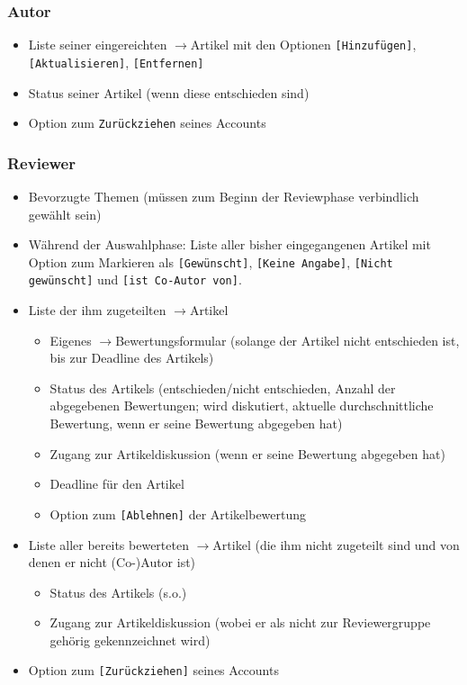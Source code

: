 \documentclass[headexclude,footexclude,12pt,BCOR0pt,DIV15]{scrartcl}
\begin{document}
        \subsubsection{Autor}
        \begin{itemize}
            \item Liste seiner eingereichten $\rightarrow$Artikel mit den Optionen \texttt{[Hinzuf\"{u}gen]},
                  \texttt{[Aktualisieren]}, \texttt{[Entfernen]}
            \item Status seiner Artikel (wenn diese entschieden sind)
            \item Option zum \texttt{Zur\"{u}ckziehen} seines Accounts
        \end{itemize}

        \pagebreak

        \subsubsection{Reviewer}
        \begin{itemize}
            \item Bevorzugte Themen (m\"{u}ssen zum Beginn der Reviewphase verbindlich gew\"{a}hlt sein)
            \item W\"{a}hrend der Auswahlphase: Liste aller bisher eingegangenen Artikel mit Option zum Markieren als
                  \texttt{[Gew\"{u}nscht]}, \texttt{[Keine Angabe]}, \texttt{[Nicht gew\"{u}nscht]} und \texttt{[ist Co-Autor von]}.
            \item Liste der ihm zugeteilten $\rightarrow$Artikel
            \begin{itemize}
                \item Eigenes $\rightarrow$Bewertungsformular (solange der Artikel nicht entschieden ist, bis zur Deadline des Artikels)
                \item Status des Artikels (entschieden/nicht entschieden, Anzahl der abgegebenen Bewertungen; wird diskutiert,
                    aktuelle durchschnittliche Bewertung, wenn er seine Bewertung abgegeben hat)
                \item Zugang zur Artikeldiskussion (wenn er seine Bewertung abgegeben hat)
                \item Deadline f\"{u}r den Artikel
                \item Option zum \texttt{[Ablehnen]} der Artikelbewertung
            \end{itemize}
            \item Liste aller bereits bewerteten $\rightarrow$Artikel (die ihm nicht zugeteilt sind und von denen er nicht (Co-)Autor ist)
            \begin{itemize}
                \item Status des Artikels (s.o.)
                \item Zugang zur Artikeldiskussion (wobei er als nicht zur Reviewergruppe geh\"{o}rig
                gekennzeichnet wird)
            \end{itemize}
            \item Option zum \texttt{[Zur\"{u}ckziehen]} seines Accounts
        \end{itemize}
\end{document}
